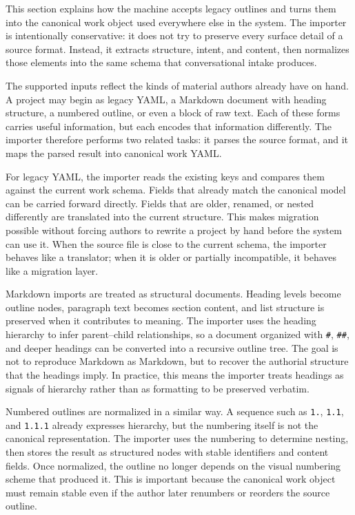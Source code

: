 This section explains how the machine accepts legacy outlines and turns them into the canonical work object used everywhere else in the system. The importer is intentionally conservative: it does not try to preserve every surface detail of a source format. Instead, it extracts structure, intent, and content, then normalizes those elements into the same schema that conversational intake produces.

The supported inputs reflect the kinds of material authors already have on hand. A project may begin as legacy YAML, a Markdown document with heading structure, a numbered outline, or even a block of raw text. Each of these forms carries useful information, but each encodes that information differently. The importer therefore performs two related tasks: it parses the source format, and it maps the parsed result into canonical work YAML.

For legacy YAML, the importer reads the existing keys and compares them against the current work schema. Fields that already match the canonical model can be carried forward directly. Fields that are older, renamed, or nested differently are translated into the current structure. This makes migration possible without forcing authors to rewrite a project by hand before the system can use it. When the source file is close to the current schema, the importer behaves like a translator; when it is older or partially incompatible, it behaves like a migration layer.

Markdown imports are treated as structural documents. Heading levels become outline nodes, paragraph text becomes section content, and list structure is preserved when it contributes to meaning. The importer uses the heading hierarchy to infer parent--child relationships, so a document organized with \texttt{\#}, \texttt{\#\#}, and deeper headings can be converted into a recursive outline tree. The goal is not to reproduce Markdown as Markdown, but to recover the authorial structure that the headings imply. In practice, this means the importer treats headings as signals of hierarchy rather than as formatting to be preserved verbatim.

Numbered outlines are normalized in a similar way. A sequence such as \texttt{1.}, \texttt{1.1}, and \texttt{1.1.1} already expresses hierarchy, but the numbering itself is not the canonical representation. The importer uses the numbering to determine nesting, then stores the result as structured nodes with stable identifiers and content fields. Once normalized, the outline no longer depends on the visual numbering scheme that produced it. This is important because the canonical work object must remain stable even if the author later renumbers or reorders the source outline.

